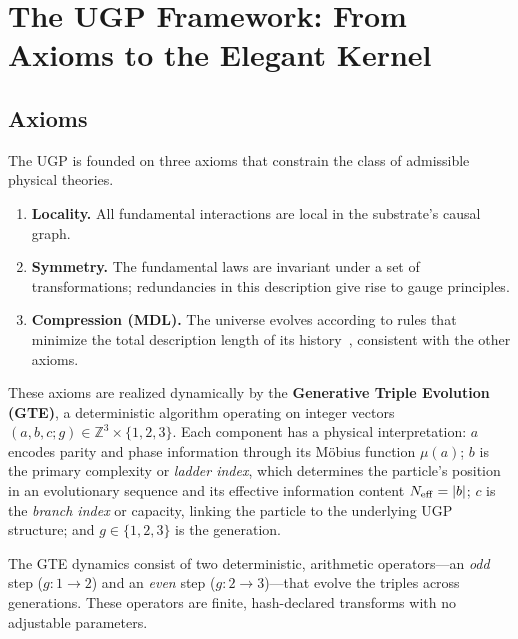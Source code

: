 \documentclass[11pt]{article}
\theoremstyle{remark}
\newcommand{\Z}{\mathbb{Z}}
\newcommand{\mob}{\mu}
\newcommand{\triple}{(a,b,c;g)}
\begin{document}
\section{The UGP Framework: From Axioms to the Elegant Kernel}
\label{sec:framework}

\subsection{Axioms}
\label{subsec:axioms}

The UGP is founded on three axioms that constrain the class of admissible physical theories.

\begin{tcolorbox}[colback=gray!5,colframe=gray!75!black,title=\textbf{The UGP Axioms}]
\begin{enumerate}[label=\textbf{A\arabic*:},leftmargin=1.8em,itemsep=0.2em]
    \item \textbf{Locality.} All fundamental interactions are local in the substrate's causal graph.
    \item \textbf{Symmetry.} The fundamental laws are invariant under a set of transformations; redundancies in this description give rise to gauge principles.
    \item \textbf{Compression (MDL).} The universe evolves according to rules that minimize the total description length of its history~\cite{RissanenMDL,GrunwaldMDL}, consistent with the other axioms.
\end{enumerate}
\end{tcolorbox}

These axioms are realized dynamically by the \textbf{Generative Triple Evolution (GTE)}, a deterministic algorithm operating on integer vectors $\triple \in \Z^3 \times \{1,2,3\}$.
Each component has a physical interpretation:
$a$ encodes parity and phase information through its M\"obius function $\mob(a)$;
$b$ is the primary complexity or \emph{ladder index}, which determines the particle's position in an evolutionary sequence and its effective information content $N_{\rm eff} = |b|$;
$c$ is the \emph{branch index} or capacity, linking the particle to the underlying UGP structure;
and $g \in \{1,2,3\}$ is the generation.

The GTE dynamics consist of two deterministic, arithmetic operators---an \emph{odd} step ($g{:}1 \to 2$) and an \emph{even} step ($g{:}2 \to 3$)---that evolve the triples across generations.
These operators are finite, hash-declared transforms with no adjustable parameters.
\end{document}
